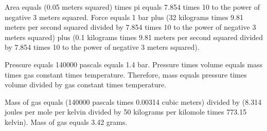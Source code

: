 Area equals (0.05 meters squared) times pi equals 7.854 times 10 to the power of negative 3 meters squared.  
Force equals 1 bar plus (32 kilograms times 9.81 meters per second squared divided by 7.854 times 10 to the power of negative 3 meters squared) plus (0.1 kilograms times 9.81 meters per second squared divided by 7.854 times 10 to the power of negative 3 meters squared).  

Pressure equals 140000 pascals equals 1.4 bar.  
Pressure times volume equals mass times gas constant times temperature. Therefore, mass equals pressure times volume divided by gas constant times temperature.  

Mass of gas equals (140000 pascals times 0.00314 cubic meters) divided by (8.314 joules per mole per kelvin divided by 50 kilograms per kilomole times 773.15 kelvin).  
Mass of gas equals 3.42 grams.